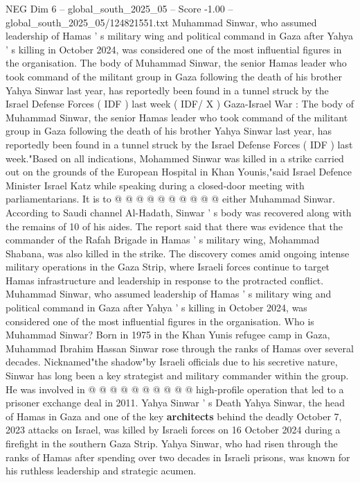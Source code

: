 \begin{textsample}{NEG Dim 6 – global\_south\_2025\_05 – Score -1.00 – global\_south\_2025\_05/124821551.txt}  \label{ex:f6_neg_388}
Muhammad Sinwar, who assumed leadership of Hamas ' s military wing and political command in Gaza after Yahya ' s killing in October 2024, was considered one of the most influential figures in the organisation.
The body of Muhammad Sinwar, the senior Hamas leader who took command of the militant group in Gaza following the death of his brother Yahya Sinwar last year, has reportedly been found in a tunnel struck by the Israel Defense Forces ( IDF ) last week ( IDF/ X ) Gaza-Israel War : The body of Muhammad Sinwar, the senior Hamas leader who took command of the militant group in Gaza following the death of his brother Yahya Sinwar last year, has reportedly been found in a tunnel struck by the Israel Defense Forces ( IDF ) last week."Based on all indications, Mohammed Sinwar was killed in a strike carried out on the grounds of the European Hospital in Khan Younis,"said Israel Defence Minister Israel Katz while speaking during a closed-door meeting with parliamentarians.
It is to @ @ @ @ @ @ @ @ @ @ either Muhammad Sinwar.
According to Saudi channel Al-Hadath, Sinwar ' s body was recovered along with the remains of 10 of his aides.
The report said that there was evidence that the commander of the Rafah Brigade in Hamas ' s military wing, Mohammad Shabana, was also killed in the strike.
The discovery comes amid ongoing intense military operations in the Gaza Strip, where Israeli forces continue to target Hamas infrastructure and leadership in response to the protracted conflict.
Muhammad Sinwar, who assumed leadership of Hamas ' s military wing and political command in Gaza after Yahya ' s killing in October 2024, was considered one of the most influential figures in the organisation.
Who is Muhammad Sinwar?
Born in 1975 in the Khan Yunis refugee camp in Gaza, Muhammad Ibrahim Hassan Sinwar rose through the ranks of Hamas over several decades.
Nicknamed"the shadow"by Israeli officials due to his secretive nature, Sinwar has long been a key strategist and military commander within the group.
He was involved in @ @ @ @ @ @ @ @ @ @ high-profile operation that led to a prisoner exchange deal in 2011.
Yahya Sinwar ' s Death Yahya Sinwar, the head of Hamas in Gaza and one of the key \textbf{architects} behind the deadly October 7, 2023 attacks on Israel, was killed by Israeli forces on 16 October 2024 during a firefight in the southern Gaza Strip.
Yahya Sinwar, who had risen through the ranks of Hamas after spending over two decades in Israeli prisons, was known for his ruthless leadership and strategic acumen.

\end{textsample}
